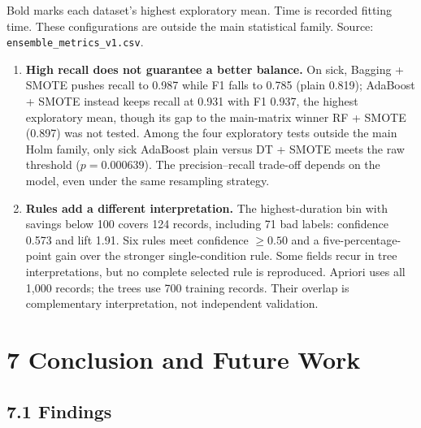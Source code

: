 \documentclass[12pt]{article}
\begin{document}
Bold marks each dataset's highest exploratory mean. Time is recorded
fitting time. These configurations are outside the main statistical family. Source:
\texttt{ensemble\_metrics\_v1.csv}.

\begin{enumerate}
\item \textbf{High recall does not guarantee a better balance.} On sick, Bagging +
SMOTE pushes recall to 0.987 while F1 falls to 0.785 (plain 0.819); AdaBoost + SMOTE
instead keeps recall at 0.931 with F1 0.937, the highest exploratory mean, though its
gap to the main-matrix winner RF + SMOTE (0.897) was not tested. Among the four
exploratory tests outside the main Holm family, only sick AdaBoost plain versus DT +
SMOTE meets the raw threshold ($p = 0.000639$). The precision--recall trade-off
depends on the model, even under the same resampling strategy.
\item \textbf{Rules add a different interpretation.} The highest-duration bin with
savings below 100 covers 124 records, including 71 bad labels: confidence 0.573 and
lift 1.91. Six rules meet confidence $\geq 0.50$ and a five-percentage-point gain over
the stronger single-condition rule. Some fields recur in tree interpretations, but no
complete selected rule is reproduced. Apriori uses all 1,000 records; the trees use
700 training records. Their overlap is complementary interpretation, not independent
validation.
\end{enumerate}

\section*{7 Conclusion and Future Work}

\subsection*{7.1 Findings}
\end{document}
